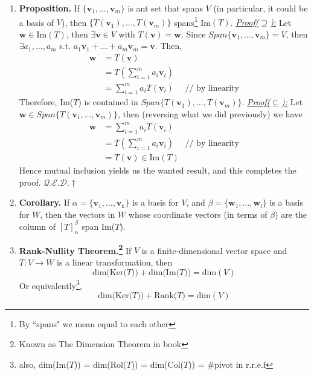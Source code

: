 \documentclass[oneside, 12pt]{book}
\newcommand{\settag}[1]{\renewcommand{\theenumi}{#1}}
\newcommand{\qed}{\hfill $\mathcal{Q}.\mathcal{E}.\mathcal{D}.\dagger$}
\newcommand{\tbf}[1]{\textbf{#1}}
\newcommand{\tit}[1]{\textit{#1}}
\newcommand{\proofsubset}{\tit{\underline{Proof($\subseteq$):}}}
\newcommand{\para}[1]{\item \tbf{#1}}
\newcommand{\vv}{\mathbf{v}}
\newcommand{\vw}{\mathbf{w}}
\begin{document}
\begin{enumerate}
        \settag{2.3.12}
        \para{Proposition.} If $\{\vv_1,\ldots,\vv_m\}$ is ant set that spans $V$ (in particular, it could be a basis of $V$), then $\{T(\vv_1),\ldots,T(\vv_m)\}$ spans\footnote{By ``spans" we mean equal to each other} Im$(T)$. \newline
        \underline{\tit{Proof($\supseteq$):}} \newline
        Let $\vw\in \text{Im}(T)$, then $\exists \vv\in V$ with $T(\vv) = \vw$. Since $Span\{\vv_1,\ldots,\vv_m\} = V$, then $\exists a_1,\ldots,a_m$ s.t. $a_1\vv_1 + \ldots + a_m\vv_m = \vv$. Then, 
        \begin{align*}
            \vw &= T(\vv) \\
            &= T\left(\sum_{i=1}^m a_i\vv_i \right) \\
            &= \sum_{i=1}^m a_iT(\vv_i) ~~~~~~\mbox{// by linearity}
        \end{align*}
        Therefore, Im($T$) is contained in $Span\{T(\vv_1),\ldots,T(\vv_m)\}$. \newline
        \proofsubset \newline
        Let $\vw\in Span\{T(\vv_1,\ldots,\vv_m)\}$, then (reversing what we did previously) we have
        \begin{align*}
            \vw &= \sum_{i=1}^m a_iT(\vv_i) \\
            &= T\left(\sum_{i=1}^m a_i\vv_i \right) ~~~~~~\mbox{// by linearity}\\
            &= T(\vv)\in \text{Im}(T)
        \end{align*}
        Hence mutual inclusion yields us the wanted result, and this completes the proof. \qed
        
        \settag{2.3.13}
        \para{Corollary.} If $\alpha = \{\vv_1,\ldots,\vv_k\}$ is a basis for $V$, and $\beta = \{\vw_1,\ldots,\vw_l\}$ is a basis for $W$, then the vectors in $W$ whose coordinate vectors (in terms of $\beta$) are the column of $[T]_\alpha^\beta$ span Im($T$).
        
        \settag{2.3.17}
        \para{Rank-Nullity Theorem.\footnote{Known as The Dimension Theorem in book}} If $V$ is a finite-dimensional vector space and $T:V\rightarrow{}W$ is a linear transformation, then 
        \begin{equation*}
            \text{dim(Ker($T$))} + \text{dim(Im($T$))} = \text{dim}(V)
        \end{equation*}
        Or equivalently\footnote{also, dim(Im($T$)) = dim(Rol($T$)) = dim(Col($T$)) = \#pivot in r.r.e.f},
        \begin{equation*}
            \text{dim(Ker($T$))} + \text{Rank($T$)} = \text{dim}(V)
        \end{equation*}
    \end{enumerate}
    
\end{document}
